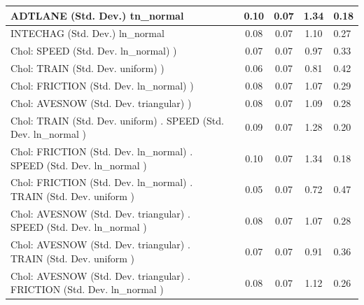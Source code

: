 \begin{table}
\begin{center}
\begin{tabular}{|l|l|c|c|c|l|}
			\hline
			ADTLANE (Std. Dev.) tn_normal &  & 0.10 & 0.07 & 1.34 & 0.18 \\
			\hline
			INTECHAG (Std. Dev.) ln_normal &  & 0.08 & 0.07 & 1.10 & 0.27 \\
			\hline
			 Chol: SPEED (Std. Dev. ln_normal) ) &  & 0.07 & 0.07 & 0.97 & 0.33 \\
			\hline
			 Chol: TRAIN (Std. Dev. uniform) ) &  & 0.06 & 0.07 & 0.81 & 0.42 \\
			\hline
			 Chol: FRICTION (Std. Dev. ln_normal) ) &  & 0.08 & 0.07 & 1.07 & 0.29 \\
			\hline
			 Chol: AVESNOW (Std. Dev. triangular) ) &  & 0.08 & 0.07 & 1.09 & 0.28 \\
			\hline
			 Chol: TRAIN (Std. Dev. uniform) . SPEED (Std. Dev.   ln_normal ) &  & 0.09 & 0.07 & 1.28 & 0.20 \\
			\hline
			 Chol: FRICTION (Std. Dev. ln_normal) . SPEED (Std. Dev.   ln_normal ) &  & 0.10 & 0.07 & 1.34 & 0.18 \\
			\hline
			 Chol: FRICTION (Std. Dev. ln_normal) . TRAIN (Std. Dev.   uniform ) &  & 0.05 & 0.07 & 0.72 & 0.47 \\
			\hline
			 Chol: AVESNOW (Std. Dev. triangular) . SPEED (Std. Dev.   ln_normal ) &  & 0.08 & 0.07 & 1.07 & 0.28 \\
			\hline
			 Chol: AVESNOW (Std. Dev. triangular) . TRAIN (Std. Dev.   uniform ) &  & 0.07 & 0.07 & 0.91 & 0.36 \\
			\hline
			 Chol: AVESNOW (Std. Dev. triangular) . FRICTION (Std. Dev.   ln_normal ) &  & 0.08 & 0.07 & 1.12 & 0.26 \\
			\hline
		\end{tabular}
	\end{center}
\end{table}